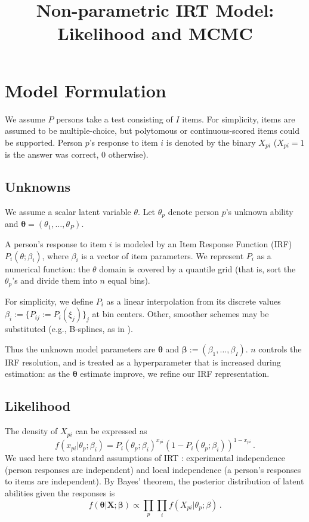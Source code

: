 \documentclass{article}
\title{Non-parametric IRT Model: Likelihood and MCMC}
\author{}
\newcommand{\bbeta}{\boldsymbol\beta}
\newcommand{\bta}{\boldsymbol\ta}
\newcommand{\ta}{\theta}
\newcommand{\bX}{\mathbf{X}}
\begin{document}
\maketitle

\section{Model Formulation}
\label{model}
We assume $P$ persons take a test consisting of $I$ items. For simplicity, items are assumed to be multiple-choice, but polytomous or continuous-scored items could be supported. Person $p$'s response to item $i$ is denoted by the binary $X_{pi}$ ($X_{pi}=1$ is the answer was correct, $0$ otherwise).

\subsection{Unknowns}
We assume a scalar latent variable $\ta$. Let $\ta_p$ denote person $p$'s unknown ability and $\bta = (\ta_1,\dots,\ta_P)$.

A person's response to item $i$ is modeled by an Item Response Function (IRF) $P_i(\ta;\beta_i)$, where $\beta_i$ is a vector of item parameters. We represent $P_i$ as a numerical function: the $\ta$ domain is covered by a quantile grid (that is, sort the $\theta_p$'s and divide them into $n$ equal bins).

For simplicity, we define $P_i$ as a linear interpolation from its discrete values $\beta_i := \{P_{ij} := P_i(\xi_j)\}_j$ at bin centers. Other, smoother schemes may be substituted (e.g., B-splines, as in \cite{matt_bsplines}).

Thus the unknown model parameters are $\bta$ and $\bbeta := (\beta_1,\dots,\beta_I)$. $n$ controls the IRF resolution, and is treated as a hyperparameter that is increased during estimation: as the $\bta$ estimate improve, we refine our IRF representation.

\subsection{Likelihood}
The density of $X_{pi}$ can be expressed as 
\begin{equation}
  f(x_{pi}|\ta_p;\beta_i) = P_i(\ta_p;\beta_i)^{x_{pi}} \left(1 - P_i(\ta_p;\beta_i)\right)^{1-x_{pi}}\,.
\end{equation}
We used here two standard assumptions of IRT \cite{junker}: experimental independence (person responses are independent) and local independence (a person's responses to items are independent). By Bayes' theorem, the posterior distribution of latent abilities given the responses is
\begin{equation}
  f(\bta|\bX;\bbeta) \propto\prod_p \prod_i f(X_{pi}|\ta_p;\beta)\,.
  \label{like}
\end{equation}
\end{document}
